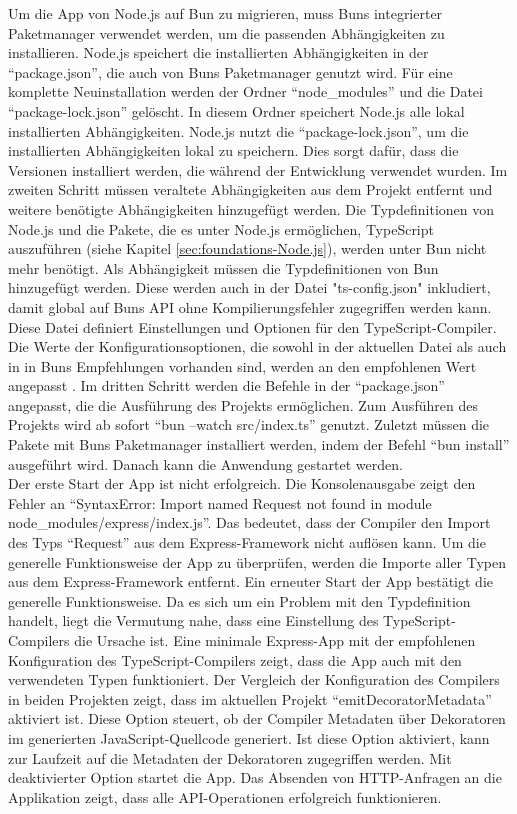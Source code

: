 \noindent
Um die App von Node.js auf Bun zu migrieren, muss Buns integrierter Paketmanager verwendet werden, um die passenden Abhängigkeiten zu installieren. Node.js speichert die installierten Abhängigkeiten in der ``package.json'', die auch von Buns Paketmanager genutzt wird. Für eine komplette Neuinstallation werden der Ordner ``node\_modules'' und die Datei ``package-lock.json'' gelöscht. In diesem Ordner speichert Node.js alle lokal installierten Abhängigkeiten. Node.js nutzt die ``package-lock.json'', um die installierten Abhängigkeiten lokal zu speichern. Dies sorgt dafür, dass die Versionen installiert werden, die während der Entwicklung verwendet wurden. \newline
Im zweiten Schritt müssen veraltete Abhängigkeiten aus dem Projekt entfernt und weitere benötigte Abhängigkeiten hinzugefügt werden. Die Typdefinitionen von Node.js und die Pakete, die es unter Node.js ermöglichen, TypeScript auszuführen (siehe Kapitel \ref{sec:foundations-Node.js}), werden unter Bun nicht mehr benötigt. Als Abhängigkeit müssen die Typdefinitionen von Bun hinzugefügt werden. Diese werden auch in der Datei "ts-config.json" inkludiert, damit global auf Buns API ohne Kompilierungsfehler zugegriffen werden kann. Diese Datei definiert Einstellungen und Optionen für den TypeScript-Compiler. Die Werte der Konfigurationsoptionen, die sowohl in der aktuellen Datei als auch in in Buns Empfehlungen vorhanden sind, werden an den empfohlenen Wert angepasst \cite{OvenSh.2023}.\newline 
Im dritten Schritt werden die Befehle in der ``package.json'' angepasst, die die Ausführung des Projekts ermöglichen. Zum Ausführen des Projekts wird ab sofort ``bun --watch src/index.ts'' genutzt. Zuletzt müssen die Pakete mit Buns Paketmanager installiert werden, indem der Befehl ``bun install'' ausgeführt wird. Danach kann die Anwendung gestartet werden.\\

\noindent
Der erste Start der App ist nicht erfolgreich. Die Konsolenausgabe zeigt den Fehler an ``SyntaxError: Import named Request not found in module node\_modules/express/index.js''. Das bedeutet, dass der Compiler den Import des Typs ``Request'' aus dem Express-Framework nicht auflösen kann. Um die generelle Funktionsweise der App zu überprüfen, werden die Importe aller Typen aus dem Express-Framework entfernt. Ein erneuter Start der App bestätigt die generelle Funktionsweise. Da es sich um ein Problem mit den Typdefinition handelt, liegt die Vermutung nahe, dass eine Einstellung des TypeScript-Compilers die Ursache ist. Eine minimale Express-App mit der empfohlenen Konfiguration des TypeScript-Compilers zeigt, dass die App auch mit den verwendeten Typen funktioniert. Der Vergleich der Konfiguration des Compilers in beiden Projekten zeigt, dass im aktuellen Projekt ``emitDecoratorMetadata'' aktiviert ist. Diese Option steuert, ob der Compiler Metadaten über Dekoratoren im generierten JavaScript-Quellcode generiert. Ist diese Option aktiviert, kann zur Laufzeit auf die Metadaten der Dekoratoren zugegriffen werden. Mit deaktivierter Option startet die App. Das Absenden von HTTP-Anfragen an die Applikation zeigt, dass alle API-Operationen erfolgreich funktionieren.\\

